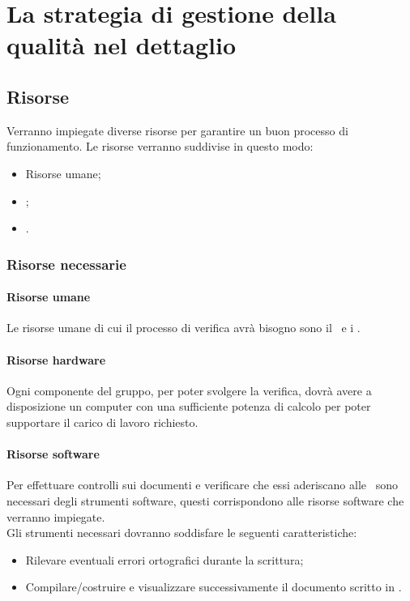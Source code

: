 \documentclass[../PianoDiQualifica.tex]{subfiles}
\begin{document}
	\section{La strategia di gestione della qualità nel dettaglio}
		\subsection{Risorse}
		Verranno impiegate diverse risorse per garantire un buon processo di funzionamento. Le risorse verranno suddivise in questo modo:
		\begin{itemize}
			\item Risorse umane;
			\item {};
			\item {}.
		\end{itemize}

			\subsubsection{Risorse necessarie}
				\paragraph{Risorse umane}
				Le risorse umane di cui il processo di verifica avrà bisogno sono il \responsabilediprogetto\ e i \verificatori.
				\paragraph{Risorse hardware}
				Ogni componente del gruppo, per poter svolgere la verifica, dovrà avere a disposizione un computer con una sufficiente potenza di calcolo per poter supportare il carico di lavoro richiesto.

				\paragraph{Risorse software}
				Per effettuare controlli sui documenti e verificare che essi aderiscano alle \normediprogettov\ sono necessari degli strumenti software, questi corrispondono alle risorse software che verranno impiegate.\\
				Gli strumenti necessari dovranno soddisfare le seguenti caratteristiche:
				\begin{itemize}
					\item Rilevare eventuali errori ortografici durante la scrittura;
					\item Compilare/costruire e visualizzare successivamente il documento scritto in \gl{\LaTeX}.
				\end{itemize}
\end{document}
